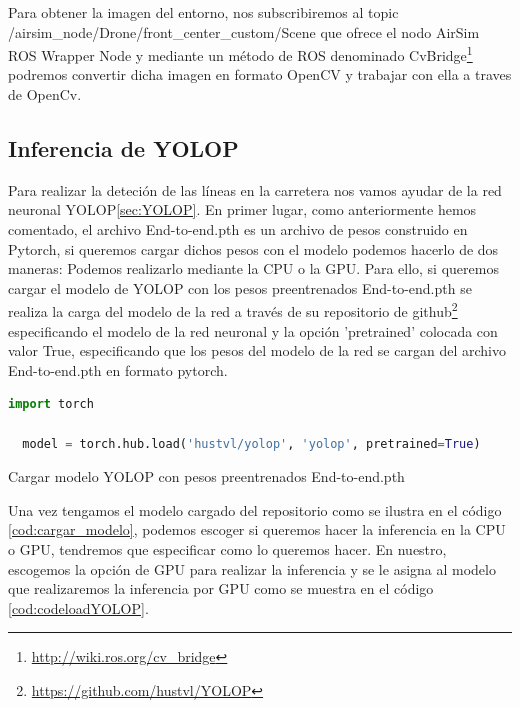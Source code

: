 Para obtener la imagen del entorno, nos subscribiremos al topic /airsim\_node/Drone/front\_center\_custom/Scene que ofrece el nodo AirSim ROS Wrapper Node
 y mediante un método de ROS denominado CvBridge\footnote{\url{http://wiki.ros.org/cv_bridge}} podremos convertir dicha imagen en formato OpenCV y trabajar con ella a traves de OpenCv.\newline

\subsection{Inferencia de YOLOP}
\label{sec:Inferencia de YOLOP}

Para realizar la deteción de las líneas en la carretera nos vamos ayudar de la red neuronal YOLOP\ref{sec:YOLOP}. En primer lugar, 
como anteriormente hemos comentado, el archivo End-to-end.pth es un archivo de pesos construido en Pytorch, si queremos cargar
dichos pesos con el modelo podemos hacerlo de dos maneras: Podemos realizarlo mediante la CPU o la GPU. 
Para ello, si queremos cargar el modelo de YOLOP con los pesos preentrenados End-to-end.pth se realiza la carga del modelo de la red a través de su repositorio de github\footnote{\url{https://github.com/hustvl/YOLOP}}
especificando el modelo de la red neuronal y la opción 'pretrained' colocada con valor True, especificando que los pesos del modelo de la red se cargan del archivo End-to-end.pth en formato pytorch.\newline
\begin{code}[h]
  \begin{lstlisting}[language=Python]
  import torch
  
  model = torch.hub.load('hustvl/yolop', 'yolop', pretrained=True)

  \end{lstlisting}
  \caption[Cargar modelo YOLOP con pesos preentrenados End-to-end.pth]{Cargar modelo YOLOP con pesos preentrenados End-to-end.pth}
  \label{cod:cargar_modelo}
  \end{code}  

Una vez tengamos el modelo cargado del repositorio como se ilustra en el código \ref{cod:cargar_modelo}, podemos escoger si queremos hacer la inferencia en la CPU o GPU, tendremos que especificar como 
lo queremos hacer. En nuestro, escogemos la opción de GPU para realizar la inferencia y se le asigna al modelo que realizaremos la inferencia por GPU 
como se muestra en el código \ref{cod:codeloadYOLOP}.\newline

